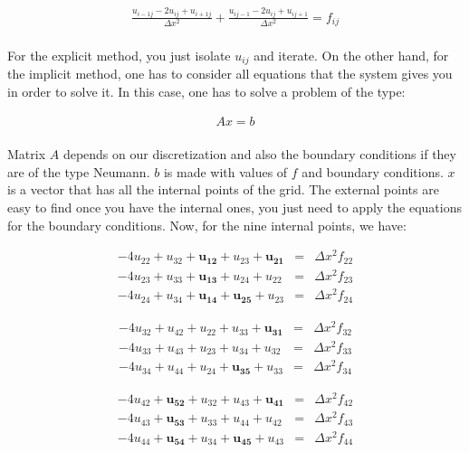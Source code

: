 \documentclass[11pt]{article}
\begin{document}
\begin{eqnarray}
\frac{u_{i-1j} - 2u_{ij} + u_{i+1j}}{\Delta x^2}	+ \frac{u_{ij-1} - 2u_{ij} + u_{ij+1}}{\Delta x^2} = f_{ij}
\end{eqnarray}


\paragraph{} For the explicit method, you just isolate $u_{ij}$ and iterate. On the other hand, for the implicit method, one has to consider all equations that the system gives you in order to solve it. In this case, one has to solve a problem of the type:

\begin{eqnarray}
Ax = b	
\end{eqnarray}

\paragraph{} Matrix $A$ depends on our discretization and also the boundary conditions if they are of the type Neumann. $b$ is made with values of $f$ and boundary conditions. $x$ is a vector that has all the internal points of the grid. The external points are easy to find once you have the internal ones, you just need to apply the equations for the boundary conditions. Now, for the nine internal points, we have:

\begin{eqnarray}
-4u_{22} + u_{32} + \boldsymbol{u_{12}} + u_{23} + \boldsymbol{u_{21}} &=& \Delta x^2 f_{22}\\
-4u_{23} + u_{33} + \boldsymbol{u_{13}} + u_{24} + u_{22} &=& \Delta x^2 f_{23}\\
-4u_{24} + u_{34} + \boldsymbol{u_{14}} + \boldsymbol{u_{25}} + u_{23} &=& \Delta x^2 f_{24}
\end{eqnarray}


\begin{eqnarray}
-4u_{32} + u_{42} + u_{22} + u_{33} + \boldsymbol{u_{31}} &=& \Delta x^2 f_{32}\\
-4u_{33} + u_{43} + u_{23} + u_{34} + u_{32} &=& \Delta x^2 f_{33}\\
-4u_{34} + u_{44} + u_{24} + \boldsymbol{u_{35}} + u_{33} &=& \Delta x^2 f_{34}
\end{eqnarray}

\begin{eqnarray}
-4u_{42} + \boldsymbol{u_{52}} + u_{32} + u_{43} + \boldsymbol{u_{41}} &=& \Delta x^2 f_{42}\\
-4u_{43} + \boldsymbol{u_{53}} + u_{33} + u_{44} + u_{42} &=& \Delta x^2 f_{43}\\
-4u_{44} + \boldsymbol{u_{54}} + u_{34} + \boldsymbol{u_{45}} + u_{43} &=& \Delta x^2 f_{44}
\end{eqnarray}
\end{document}
